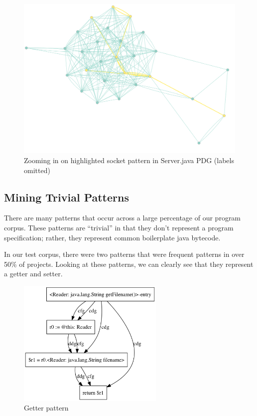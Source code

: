 \documentclass[12pt]{article}
\begin{document}
\begin{figure}[H]
\centerline{
\includegraphics[width=\linewidth]{patterns/networking_isomorphism_zoomed.png}
}
\caption{\label{networking_isomorphism_zoomed}
    Zooming in on highlighted socket pattern in Server.java PDG (labels omitted)
}
\end{figure}


\subsection{Mining Trivial Patterns}
There are many patterns that occur across a large percentage of our program corpus. These patterns are ``trivial'' in that they don't represent a program specification; rather, they represent common boilerplate java bytecode.

In our test corpus, there were two patterns that were frequent patterns in over 50\% of projects. Looking at these patterns, we can clearly see that they represent a getter and setter.

\begin{figure}[H]
\centerline{
\includegraphics[width=7cm]{patterns/reader_getter.png}
}
\caption{\label{reader_getter}
    Getter pattern
}
\end{figure}
\end{document}
